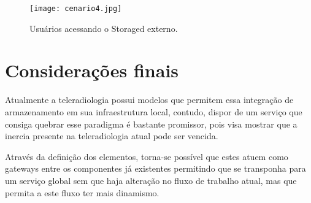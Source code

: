 \documentclass[conference]{IEEEtran}
\begin{document}

\begin{figure}
\centering
\texttt{[image: cenario4.jpg]}
\caption{Usuários acessando o Storaged externo.}
\label{fig:cenario}
\end{figure}

\section{Considerações finais}

Atualmente a teleradiologia possui modelos que permitem essa integração de armazenamento em sua infraestrutura local, contudo, dispor de um serviço que consiga quebrar esse paradigma é bastante promissor, pois visa mostrar que a inercia presente na teleradiologia atual pode ser vencida.

Através da definição dos elementos, torna-se possível que estes atuem como gateways entre os componentes já existentes permitindo que se transponha para um serviço global sem que haja alteração no fluxo de trabalho atual, mas que permita a este fluxo ter mais dinamismo.

\addtolength{\textheight}{-12cm}   %




\end{document}
